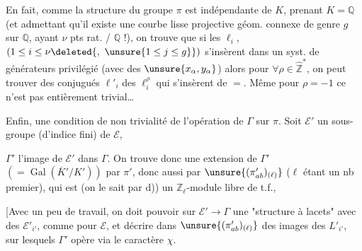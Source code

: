 En fait, comme la structure du groupe \(\pi\) est indépendante de \(K\),
prenant \(K=\mathbb Q\) (et admettant qu'il existe une courbe lisse projective
géom. connexe de genre \(g\) sur \(\mathbb Q\), ayant \(\nu\) pts rat. / \(\mathbb Q\) !),
on trouve que si les \(\ell_i\), 
\((1\leq i\leq\nu\deleted{,\ \unsure{1\leq j\leq g}})\)
 s'insèrent dans un syst. de générateurs
privilégié (avec des \(\unsure{x_\alpha,y_\alpha}\)) alors pour
\(\forall\rho\in\widehat{\mathbb Z}^{*}\), on peut trouver des conjugués
\(\ell'_i\) des \(\ell_i^\rho\) qui s'insèrent de \(=\).
Même pour \(\rho=-1\) ce n'est pas entièrement trivial\ldots

 Enfin,  une condition
 de non trivialité de l'opération de \(\Gamma\) sur \(\pi\).
Soit \(\mathcal E'\) un sous-groupe 
(d'indice fini) de \(\mathcal E\),



\(\Gamma'\) l'image de \(\mathcal E'\) dans \(\Gamma\). On trouve donc une
extension de \(\Gamma'\) \((=\operatorname{Gal}(\overline K'/K'))\) par \(\pi'\),
donc aussi par \(\unsure{(\pi'_{ab})_{(\ell)}}\)
(\(\ell\) étant un nb premier), qui est (on le sait par d)) un
\(\mathbb Z_\ell\)-module libre de t.f.,

[Avec un peu de travail, on doit pouvoir  sur
\(\mathcal E'\to\Gamma\) une "structure à lacets" avec des
\(\mathcal E'_{i'}\), comme pour \(\mathcal E\), et décrire dans
\(\unsure{(\pi'_{ab})_{(\ell)}}\)
 des images des  \(L'_{i'}\),
sur lesquels \(\Gamma'\) opère  via le caractère \(\chi\).

